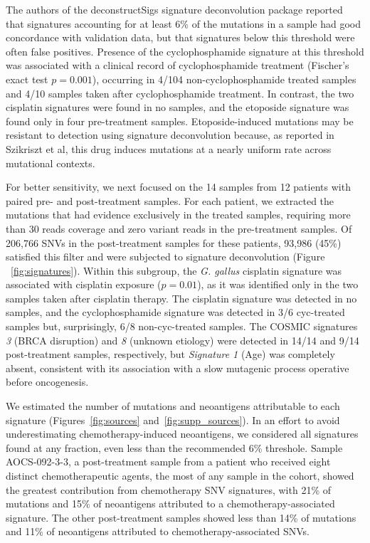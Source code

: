 The authors of the deconstructSigs signature deconvolution package reported that signatures accounting for at least 6\% of the mutations in a sample had good concordance with validation data, but that signatures below this threshold were often false positives. Presence of the cyclophosphamide signature at this threshold was associated with a clinical record of cyclophosphamide treatment (Fischer's exact test $p = 0.001$), occurring in 4/104 non-cyclophosphamide treated samples and 4/10 samples taken after cyclophosphamide treatment. In contrast, the two cisplatin signatures were found in no samples, and the etoposide signature was found only in four pre-treatment samples. Etoposide-induced mutations may be resistant to detection using signature deconvolution because, as reported in Szikriszt et al, this drug induces mutations at a nearly uniform rate across mutational contexts. 


For better sensitivity, we next focused on the 14 samples from 12 patients with paired pre- and post-treatment samples. For each patient, we extracted the mutations that had evidence exclusively in the treated samples, requiring more than 30 reads coverage and zero variant reads in the pre-treatment samples. Of 206,766 SNVs in the post-treatment samples for these patients, 93,986 (45\%) satisfied this filter and were subjected to signature deconvolution (Figure ~\ref{fig:signatures}). Within this subgroup, the \textit{G. gallus} cisplatin signature was associated with cisplatin exposure ($p = 0.01$), as it was identified only in the two samples taken after cisplatin therapy. The  cisplatin signature was detected in no samples, and the cyclophosphamide signature was detected in 3/6 cyc-treated samples but, surprisingly, 6/8 non-cyc-treated samples. The COSMIC signatures \textit{3} (BRCA disruption) and \textit{8} (unknown etiology) were detected in 14/14 and 9/14 post-treatment samples, respectively, but \textit{Signature 1} (Age) was completely absent, consistent with its association with a slow mutagenic process operative before oncogenesis.

We estimated the number of mutations and neoantigens attributable to each signature (Figures~\ref{fig:sources} and~\ref{fig:supp_sources}). In an effort to avoid underestimating chemotherapy-induced neoantigens, we considered all signatures found at any fraction, even less than the recommended 6\% threshole. Sample AOCS-092-3-3, a post-treatment sample from a patient who received eight distinct chemotherapeutic agents, the most of any sample in the cohort, showed the greatest contribution from chemotherapy SNV signatures, with 21\% of mutations and 15\% of neoantigens attributed to a chemotherapy-associated signature. The other post-treatment samples showed less than 14\% of mutations and 11\% of neoantigens attributed to chemotherapy-associated SNVs.

